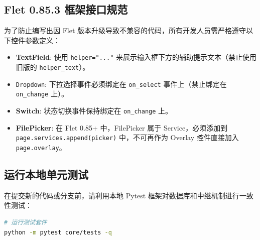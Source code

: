 \documentclass[UTF8]{ctexart}
\begin{document}
\subsection{Flet 0.85.3 框架接口规范}
为了防止编写出因 Flet 版本升级导致不兼容的代码，所有开发人员需严格遵守以下控件参数定义：
\begin{itemize}
    \item \textbf{TextField}: 使用 \texttt{helper="..."} 来展示输入框下方的辅助提示文本（禁止使用旧版的 \texttt{helper\_text}）。
    \item \texttt{Dropdown}: 下拉选择事件必须绑定在 \texttt{on\_select} 事件上（禁止绑定在 \texttt{on\_change} 上）。
    \item \textbf{Switch}: 状态切换事件保持绑定在 \texttt{on\_change} 上。
    \item \textbf{FilePicker}: 在 Flet 0.85+ 中，FilePicker 属于 Service，必须添加到 \texttt{page.services.append(picker)} 中，不可再作为 Overlay 控件直接加入 \texttt{page.overlay}。
\end{itemize}

\subsection{运行本地单元测试}
在提交新的代码或分支前，请利用本地 Pytest 框架对数据库和中继机制进行一致性测试：
\begin{lstlisting}[language=bash]
# 运行测试套件
python -m pytest core/tests -q
\end{lstlisting}
\end{document}
